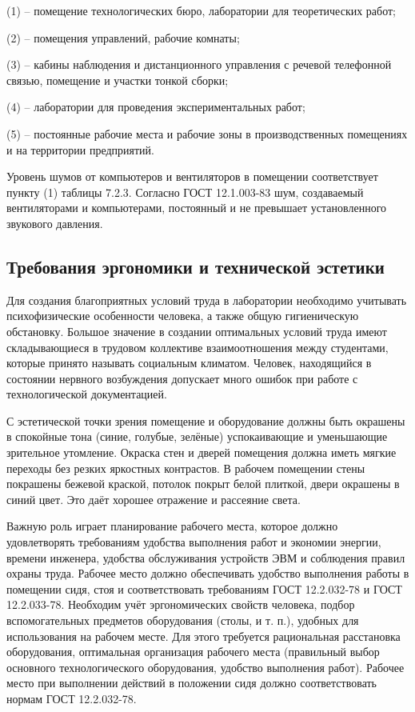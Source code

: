 (1) – помещение технологических бюро, лаборатории для теоретических работ;

(2) – помещения управлений, рабочие комнаты;

(3) – кабины наблюдения и дистанционного управления с речевой телефонной связью, помещение и участки тонкой сборки;

(4) – лаборатории для проведения экспериментальных работ;

(5) – постоянные рабочие места и рабочие зоны в производственных помещениях и на территории предприятий.

Уровень шумов от компьютеров и вентиляторов в помещении соответствует пункту (1) таблицы 7.2.3. Согласно ГОСТ 12.1.003-83 шум, создаваемый вентиляторами и компьютерами, постоянный и не превышает установленного звукового давления.

\subsection{Требования эргономики и технической эстетики}
Для создания благоприятных условий труда в лаборатории необходимо учитывать психофизические особенности человека, а также общую гигиеническую обстановку. Большое значение в создании оптимальных условий труда имеют складывающиеся в трудовом коллективе взаимоотношения между студентами, которые принято называть социальным климатом. Человек, находящийся в состоянии нервного возбуждения допускает много ошибок при работе с технологической документацией.

С эстетической точки зрения помещение и оборудование должны быть окрашены в спокойные тона (синие, голубые, зелёные) успокаивающие и уменьшающие зрительное утомление. Окраска стен и дверей помещения должна иметь мягкие переходы без резких яркостных контрастов. В рабочем помещении стены покрашены бежевой краской, потолок покрыт белой плиткой, двери окрашены в синий цвет. Это даёт хорошее отражение и рассеяние света.

Важную роль играет планирование рабочего места, которое должно удовлетворять требованиям удобства выполнения работ и экономии энергии, времени инженера, удобства обслуживания устройств ЭВМ и соблюдения правил охраны труда. Рабочее место должно обеспечивать удобство выполнения работы в помещении сидя, стоя и соответствовать требованиям ГОСТ 12.2.032-78 и ГОСТ 12.2.033-78. Необходим учёт эргономических свойств человека, подбор вспомогательных предметов оборудования (столы, и т. п.), удобных для использования на рабочем месте. Для этого требуется рациональная расстановка оборудования, оптимальная организация рабочего места (правильный выбор основного технологического оборудования, удобство выполнения работ). Рабочее место при выполнении действий в положении сидя должно соответствовать нормам ГОСТ 12.2.032-78.

